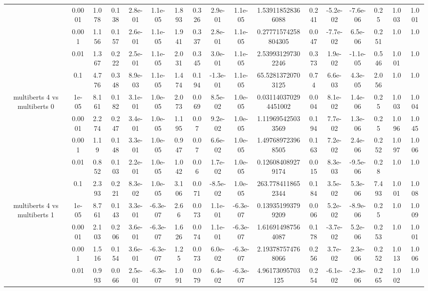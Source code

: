 \begin{tabular}{|c|c|c|c|c|c|c|c|c|c|c|c|c|c|c|c|c|}
 & 0.0001 & 1.078 & 0.138 & 2.8e-01 & 1.1e-05 & 1.893 & 0.326 & 2.9e-01 & 1.1e-05 & 1.539118528366088 & 0.241 & -5.2e-02 & -7.6e-06 & 0.25 & 1.003 & 1.001 \\
 & 0.001 & 1.156 & 0.157 & 2.6e-01 & 1.1e-05 & 1.941 & 0.337 & 2.8e-01 & 1.1e-05 & 0.27771574258804305 & 0.047 & -7.7e-02 & 6.5e-06 & 0.251 & 1.0 & 1.0 \\
 & 0.01 & 1.367 & 0.222 & 2.5e-01 & 1.1e-05 & 2.031 & 0.345 & 3.0e-01 & 1.1e-05 & 2.539931297302246 & 0.373 & 1.9e-02 & -1.1e-05 & 0.546 & 1.001 & 1.0 \\
 & 0.1 & 4.776 & 0.348 & 8.9e-03 & 1.1e-05 & 1.474 & 0.194 & -1.3e-01 & 1.1e-05 & 65.52813720703125 & 0.74 & 6.6e-03 & 4.3e-05 & 2.056 & 1.0 & 1.0 \\
\hline
\multirow{5}{*}{multiberts 4 vs multiberts 0} & 1e-05 & 8.161 & 0.182 & 3.1e-01 & 1.0e-05 & 2.073 & 0.069 & 8.5e-02 & 1.0e-05 & 0.031140370294451002 & 0.004 & 8.1e-02 & 1.4e-06 & 0.25 & 1.003 & 1.004 \\
 & 0.0001 & 2.274 & 0.247 & 3.4e-01 & 1.0e-05 & 1.195 & 0.07 & 9.2e-02 & 1.0e-05 & 1.119695425033569 & 0.194 & 7.7e-02 & 1.3e-06 & 0.25 & 1.096 & 1.045 \\
 & 0.001 & 1.19 & 0.148 & 3.3e-01 & 1.0e-05 & 0.947 & 0.07 & 6.6e-02 & 1.0e-05 & 1.497689723968505 & 0.163 & 7.2e-02 & 2.4e-06 & 0.252 & 1.097 & 1.006 \\
 & 0.01 & 0.852 & 0.103 & 2.2e-01 & 1.0e-05 & 1.042 & 0.06 & 1.7e-02 & 1.0e-05 & 0.126084089279174 & 0.015 & 8.3e-03 & -9.5e-06 & 0.28 & 1.0 & 1.0 \\
 & 0.1 & 2.393 & 0.221 & 8.3e-02 & 1.0e-05 & 3.106 & 0.071 & -8.5e-02 & 1.0e-05 & 263.7784118652344 & 0.184 & 3.5e-02 & 5.3e-06 & 7.493 & 1.001 & 1.008 \\
\hline
\multirow{5}{*}{multiberts 4 vs multiberts 1} & 1e-05 & 8.761 & 0.143 & 3.3e-01 & -6.3e-07 & 2.66 & 0.073 & 1.1e-01 & -6.3e-07 & 0.139351993799209 & 0.006 & 5.2e-02 & -8.9e-06 & 0.25 & 1.0 & 1.009 \\
 & 0.0001 & 2.103 & 0.206 & 3.6e-01 & -6.3e-07 & 1.626 & 0.074 & 1.1e-01 & -6.3e-07 & 1.616914987564087 & 0.178 & -3.7e-02 & 5.2e-06 & 0.253 & 1.0 & 1.001 \\
 & 0.001 & 1.516 & 0.154 & 3.6e-01 & -6.3e-07 & 1.25 & 0.073 & 6.0e-02 & -6.3e-07 & 2.193787574768066 & 0.256 & 3.7e-02 & 2.3e-06 & 0.252 & 1.013 & 1.006 \\
 & 0.01 & 0.993 & 0.066 & 2.5e-01 & -6.3e-07 & 1.091 & 0.079 & 6.4e-02 & -6.3e-07 & 4.96173095703125 & 0.254 & -6.1e-02 & -2.3e-06 & 0.265 & 1.002 & 1.0 \\

\end{tabular}
